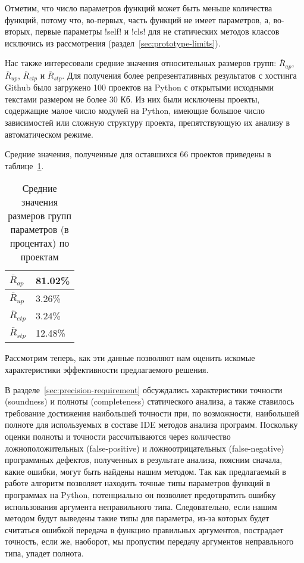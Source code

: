 Отметим, что число параметров функций может быть меньше количества функций,
потому что, во-первых, часть функций не имеет параметров, а, во-вторых, первые
параметры !self! и !cls! для не статических методов классов исключись из
рассмотрения (раздел~\ref{sec:prototype-limits}).

Нас также интересовали средние значения относительных размеров групп: $\bar{R}_{ap}$,
$\bar{R}_{up}$, $\bar{R}_{etp}$ и $\bar{R}_{stp}$. Для получения более
репрезентативных результатов с хостинга Github было загружено 100 проектов на
Python с открытыми исходными текстами размером не более 30 Кб. Из них были
исключены проекты, содержащие малое число модулей на Python, имеющие большое
число зависимостей или сложную структуру проекта, препятствующую их анализу в
автоматическом режиме. 

Средние значения, полученные для оставшихся 66 проектов приведены в
таблице~\ref{tab:statistics-results-2}.

\begin{table}[H]
  \small
  \caption{Средние значения размеров групп параметров (в процентах) по проектам}
  \label{tab:statistics-results-2}
  \centering
  \begin{tabularx}{0.5\textwidth}{ |X|X| }

    \hline
    $\bar{R}_{ap}$ & 81.02\% \\ \hline

    $\bar{R}_{up}$ & 3.26\% \\ \hline

    $\bar{R}_{etp}$ & 3.24\% \\ \hline

    $\bar{R}_{stp}$ & 12.48\% \\ \hline

  \end{tabularx}
\end{table} 

Рассмотрим теперь, как эти данные позволяют нам оценить искомые характеристики
эффективности предлагаемого решения.

В разделе~\ref{sec:precision-requirement} обсуждались характеристики точности
(soundness) и полноты (completeness) статического анализа, а также ставилось
требование достижения наибольшей точности при, по возможности, наибольшей
полноте для используемых в составе IDE методов анализа программ. Поскольку
оценки полноты и точности рассчитываются через количество ложноположительных
(false-positive) и ложноотрицательных (false-negative) программных дефектов,
полученных в результате анализа, поясним сначала, какие ошибки, могут быть
найдены нашим методом.  Так как предлагаемый в работе алгоритм позволяет
находить точные типы параметров функций в программах на Python, потенциально он
позволяет предотвратить ошибку использования аргумента неправильного типа.
Следовательно, если нашим методом будут выведены такие типы для параметра, из-за
которых будет считаться ошибкой передача в функцию правильных аргументов,
пострадает точность, если же, наоборот, мы пропустим передачу аргументов
неправльного типа, упадет полнота.

